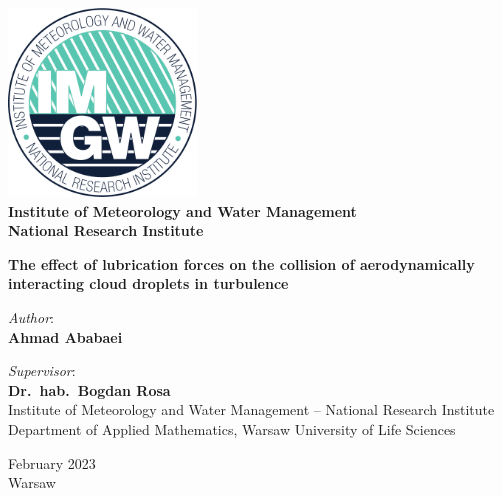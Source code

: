 \documentclass[../thesis.tex]{subfiles}
\begin{document}
\begin{titlepage}
\centering
\includegraphics[width=5cm]{figs/IMGW-PIB_LOGO.pdf}
\\ 
\large\textbf{Institute of Meteorology and Water Management
\\National Research Institute} \\

\vspace{2cm}

\LARGE{\textbf{The effect of lubrication forces on the collision of aerodynamically interacting cloud droplets in turbulence}} \\

\vspace{2cm}

\normalsize{\textit{Author}:} \\
{\textbf{Ahmad Ababaei}} \\

\vspace{2cm}

\normalsize{\textit{Supervisor}: \\
\textbf{Dr.\ hab.\ Bogdan Rosa} \\
Institute of Meteorology and Water Management -- National Research Institute} \\
Department of Applied Mathematics, Warsaw University of Life Sciences \\

\vfill

\normalsize{February 2023\\Warsaw}

\end{titlepage}
\newpage
\end{document}
